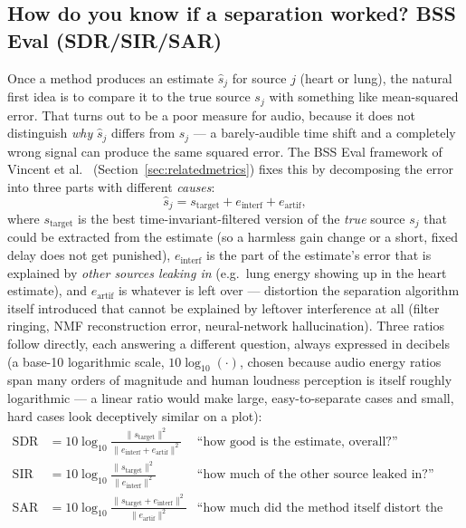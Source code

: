 \documentclass[11pt]{article}
\begin{document}
\subsection{How do you know if a separation worked? BSS Eval (SDR/SIR/SAR)}
\label{sec:bg-bsseval}

Once a method produces an estimate $\hat s_j$ for source $j$ (heart or
lung), the natural first idea is to compare it to the true source $s_j$ with
something like mean-squared error. That turns out to be a poor measure for
audio, because it does not distinguish \emph{why} $\hat s_j$ differs from
$s_j$ --- a barely-audible time shift and a completely wrong signal can
produce the same squared error. The BSS Eval framework of Vincent et al.\
\cite{vincent2006} (Section~\ref{sec:relatedmetrics}) fixes this by
decomposing the error into three parts with different \emph{causes}:
\begin{equation}
\hat s_j = s_{\text{target}} + e_{\text{interf}} + e_{\text{artif}},
\end{equation}
where $s_{\text{target}}$ is the best time-invariant-filtered version of
the \emph{true} source $s_j$ that could be extracted from the estimate
(so a harmless gain change or a short, fixed delay does not get punished),
$e_{\text{interf}}$ is the part of the estimate's error that is explained
by \emph{other sources leaking in} (e.g.\ lung energy showing up in the
heart estimate), and $e_{\text{artif}}$ is whatever is left over ---
distortion the separation algorithm itself introduced that cannot be
explained by leftover interference at all (filter ringing, NMF
reconstruction error, neural-network hallucination). Three ratios follow
directly, each answering a different question, always expressed in
decibels (a base-10 logarithmic scale, $10\log_{10}(\cdot)$, chosen because
audio energy ratios span many orders of magnitude and human loudness
perception is itself roughly logarithmic --- a linear ratio would make
large, easy-to-separate cases and small, hard cases look deceptively
similar on a plot):
\begin{align}
\text{SDR} &= 10\log_{10}\frac{\lVert s_{\text{target}} \rVert^2}
  {\lVert e_{\text{interf}} + e_{\text{artif}} \rVert^2}
  &\text{``how good is the estimate, overall?''} \\
\text{SIR} &= 10\log_{10}\frac{\lVert s_{\text{target}} \rVert^2}
  {\lVert e_{\text{interf}} \rVert^2}
  &\text{``how much of the other source leaked in?''} \\
\text{SAR} &= 10\log_{10}\frac{\lVert s_{\text{target}} + e_{\text{interf}} \rVert^2}
  {\lVert e_{\text{artif}} \rVert^2}
  &\text{``how much did the method itself distort the signal?''}
\end{align}
\end{document}
